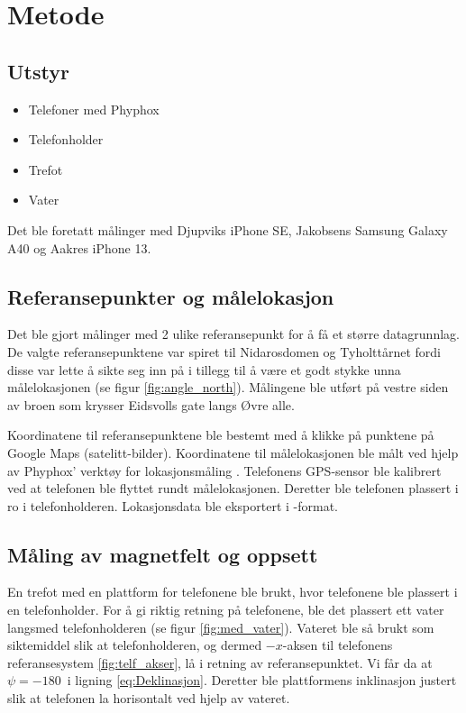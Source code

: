 \section{Metode}
\subsection{Utstyr}
\begin{itemize}
    \item Telefoner med Phyphox
    \item Telefonholder
    \item Trefot
    \item Vater
\end{itemize}
Det ble foretatt målinger med Djupviks iPhone SE, Jakobsens Samsung Galaxy A40 og Aakres iPhone 13. 

\subsection{Referansepunkter og målelokasjon}
Det ble gjort målinger med 2 ulike referansepunkt for å få et større datagrunnlag. De valgte referansepunktene var spiret til Nidarosdomen og Tyholttårnet fordi disse var lette å sikte seg inn på i tillegg til å være et godt stykke unna målelokasjonen (se figur \ref{fig:angle_north}). 
Målingene ble utført på vestre siden av broen som krysser Eidsvolls gate langs Øvre alle. 

Koordinatene til referansepunktene ble bestemt med å klikke på punktene på Google Maps (satelitt-bilder). 
Koordinatene til målelokasjonen ble målt ved hjelp av Phyphox' verktøy for lokasjonsmåling \cite{phyphox}. Telefonens GPS-sensor ble kalibrert ved at telefonen ble flyttet rundt målelokasjonen. 
Deretter ble telefonen plassert i ro i telefonholderen. 
Lokasjonsdata ble eksportert i -format.



\subsection{Måling av magnetfelt og oppsett}
En trefot med en plattform for telefonene ble brukt, hvor telefonene ble plassert i en telefonholder. For å gi riktig retning på telefonene, ble det plassert ett vater langsmed telefonholderen (se figur \ref{fig:med_vater}). Vateret ble så brukt som siktemiddel slik at telefonholderen, og dermed $-x$-aksen til telefonens referansesystem \ref{fig:telf_akser}, lå i retning av referansepunktet. Vi får da at $\psi = -180$\textdegree\ i ligning \eqref{eq:Deklinasjon}. Deretter ble plattformens inklinasjon justert slik at telefonen la horisontalt ved hjelp av vateret.

